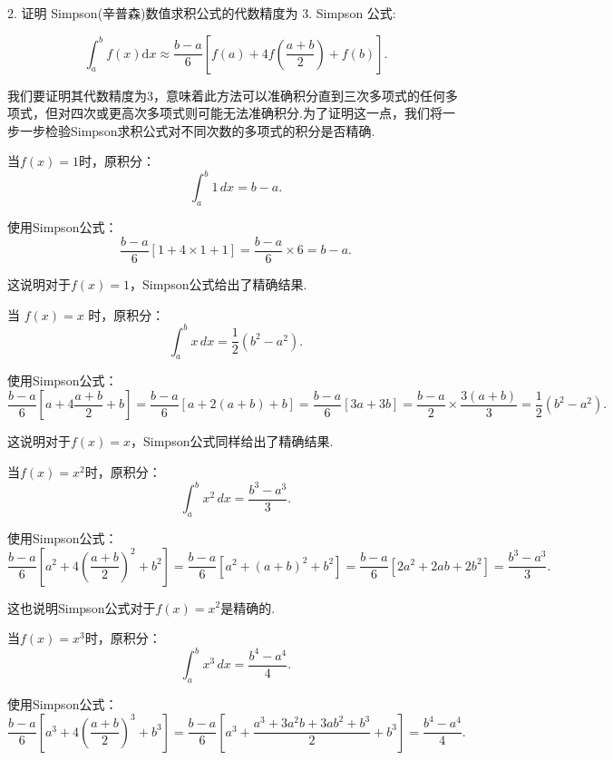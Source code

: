 \begin{tcolorbox}[breakable,
		colframe=white!10!jingga, coltitle=white!90!jingga, colback=white!95!jingga, coltext=black, colbacktitle=white!10!jingga, enhanced, fonttitle=\bfseries,fontupper=\normalsize, attach boxed title to top left={yshift=-2mm}, before skip=8pt, after skip=8pt,
		title=解答题]

2. 证明 Simpson(辛普森)数值求积公式的代数精度为 3.
   \tcblower
Simpson 公式:

$${\int}_{a}^{b}f(x)\mathrm{d}x {\approx} \frac{b {-} a}{6}\left\lbrack f(a) + 4f\left( \frac{a + b}{2} \right) + f(b) \right\rbrack.$$


我们要证明其代数精度为3，意味着此方法可以准确积分直到三次多项式的任何多项式，但对四次或更高次多项式则可能无法准确积分.为了证明这一点，我们将一步一步检验Simpson求积公式对不同次数的多项式的积分是否精确.

  当$f(x) = 1$时，原积分：
$$\int_a^b 1 \, dx = b - a.$$

使用Simpson公式：
$$\frac{b-a}{6} \left[1 + 4 \times 1 + 1\right] = \frac{b-a}{6} \times 6 = b - a.$$

这说明对于$f(x) = 1$，Simpson公式给出了精确结果.

当 $f(x) = x$ 时，原积分：
$$\int_a^b x \, dx = \frac{1}{2}(b^2 - a^2).$$

使用Simpson公式：
$$\frac{b-a}{6} \left[a + 4\frac{a+b}{2} + b\right] = \frac{b-a}{6} \left[a + 2(a+b) + b\right] = \frac{b-a}{6} \left[3a + 3b\right] = \frac{b-a}{2} \times \frac{3(a+b)}{3} = \frac{1}{2}(b^2 - a^2).$$

这说明对于$f(x) = x$，Simpson公式同样给出了精确结果.

当$f(x) = x^2$时，原积分：
$$\int_a^b x^2 \, dx = \frac{b^3 - a^3}{3}.$$

使用Simpson公式：
$$\frac{b-a}{6} \left[a^2 + 4\left(\frac{a+b}{2}\right)^2 + b^2\right] = \frac{b-a}{6} \left[a^2 + (a+b)^2 + b^2\right] = \frac{b-a}{6} \left[2a^2 + 2ab + 2b^2\right] = \frac{b^3 - a^3}{3}.$$

这也说明Simpson公式对于$f(x) = x^2$是精确的.

当$f(x) = x^3$时，原积分：
$$\int_a^b x^3 \, dx = \frac{b^4 - a^4}{4}.$$

使用Simpson公式：
$$\frac{b-a}{6} \left[a^3 + 4\left(\frac{a+b}{2}\right)^3 + b^3\right] = \frac{b-a}{6} \left[a^3 + \frac{a^3 + 3a^2b + 3ab^2 + b^3}{2} + b^3\right] = \frac{b^4 - a^4}{4}.$$


\end{tcolorbox}
